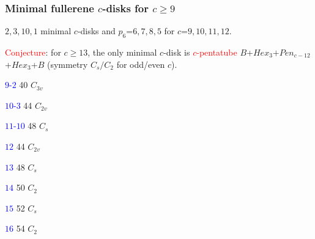 \documentclass{beamer}
\begin{document}
\begin{frame}\frametitle{Minimal fullerene $c$-disks for
$c\ge 9$} 
\vspace{-2mm}
$2,3,10,1$ minimal $c$-disks 
and 
$p_6$=$6,7,8,5$ for $c$=$9,10,11,12$.

\textcolor{red}{Conjecture}: for $c\ge 13$, the only
minimal $c$-disk  is \textcolor{red}{$c$-pentatube} 
$B$+$Hex_3$$+$$Pen_{c-12}$+$Hex_3$+$B$ (symmetry $C_s/C_2$ for odd/even 
$c$).
\vspace{-2mm}
\begin{center}
\begin{minipage}[b]{17mm}\centering
{}\par
\textcolor{blue}{$9$-$2$} 40 $C_{3v}$
\end{minipage}
\begin{minipage}[b]{17mm}
\centering
{}\par
\textcolor{blue}{$10$-$3$} 44 $C_{2v}$
\end{minipage}
\begin{minipage}[b]{17mm}
\centering
{}\par
\textcolor{blue}{$11$-$10$} 48 $C_{s}$
\end{minipage}
\begin{minipage}[b]{27mm}
\centering
{}\par
\textcolor{blue}{$12$} 44 $C_{2v}$
\end{minipage}
\end{center}
\vspace{-2mm}

\begin{center} 
\begin{minipage}[b]{26mm}
\centering
{}\par
\textcolor{blue}{$13$} 48 $C_{s}$
\end{minipage}
\begin{minipage}[b]{26mm}
\centering
{}\par
\textcolor{blue}{$14$} 50 $C_{2}$
\end{minipage}
\begin{minipage}[b]{26mm}
\centering
{}\par
\textcolor{blue}{$15$} 52 $C_{s}$
\end{minipage}
\begin{minipage}[b]{26mm}
\centering
{}\par
\textcolor{blue}{$16$} 54 $C_{2}$
\end{minipage}   
\end{center}     
\end{frame}
\end{document}
